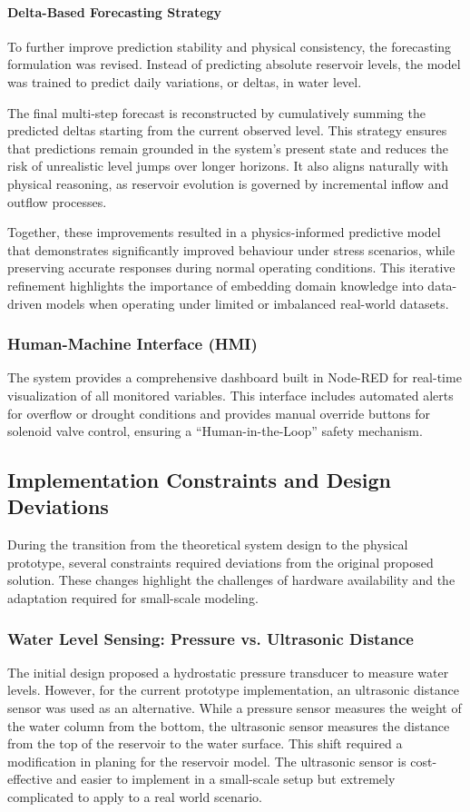 \paragraph{Delta-Based Forecasting Strategy}
To further improve prediction stability and physical consistency, the forecasting formulation was revised. Instead of predicting absolute reservoir levels, the model was trained to predict daily variations, or deltas, in water level.

The final multi-step forecast is reconstructed by cumulatively summing the predicted deltas starting from the current observed level. This strategy ensures that predictions remain grounded in the system's present state and reduces the risk of unrealistic level jumps over longer horizons. It also aligns naturally with physical reasoning, as reservoir evolution is governed by incremental inflow and outflow processes.

Together, these improvements resulted in a physics-informed predictive model that demonstrates significantly improved behaviour under stress scenarios, while preserving accurate responses during normal operating conditions. This iterative refinement highlights the importance of embedding domain knowledge into data-driven models when operating under limited or imbalanced real-world datasets.

\subsubsection{Human-Machine Interface (HMI)}
The system provides a comprehensive dashboard built in Node-RED for real-time visualization of all monitored variables. This interface includes automated alerts for overflow or drought conditions and provides manual override buttons for solenoid valve control, ensuring a ``Human-in-the-Loop'' safety mechanism.

\subsection{Implementation Constraints and Design Deviations}
During the transition from the theoretical system design to the physical prototype, several constraints required deviations from the original proposed solution. These changes highlight the challenges of hardware availability and the adaptation required for small-scale modeling.

\subsubsection{Water Level Sensing: Pressure vs. Ultrasonic Distance}
The initial design proposed a hydrostatic pressure transducer to measure water levels. However, for the current prototype implementation, an ultrasonic distance sensor was used as an alternative. While a pressure sensor measures the weight of the water column from the bottom, the ultrasonic sensor measures the distance from the top of the reservoir to the water surface. This shift required a modification in planing for the reservoir model. The ultrasonic sensor is cost-effective and easier to implement in a small-scale setup but extremely complicated to apply to a real world scenario.

